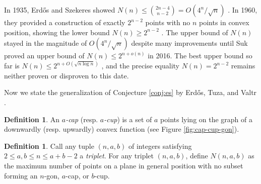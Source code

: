 \documentclass{amsart}
\theoremstyle{definition}
\newtheorem{definition}[thm]{Definition}
\numberwithin{thm}{section}
\begin{document}
In 1935, Erd\H{o}s and Szekeres showed $N(n) \leq \binom{2n-4}{n-2} = O\left(4^n/\sqrt{n}\right)$ \cite{erdos1935combinatorial}.
In 1960, they provided a construction of exactly $2^{n-2}$ points with no $n$ points in convex position, showing the lower bound $N(n) \geq 2^{n-2}$ \cite{erd1960some}.
The upper bound of $N(n)$ stayed in the magnitude of $O(4^n/\sqrt{n})$ despite many improvements 
\cite{chung1998forced,kleitman1998finding,toth1998note,toth2005erdos, mojarrad2016improved,norin2016erdHos} until Suk \cite{suk2017erdHos} proved an upper bound of $N(n) \leq 2^{n + o(n)}$ in 2016.
The best upper bound so far is $N(n) \leq 2^{n + O(\sqrt{n \log n})}$ \cite{holmsen2020two}, and the precise equality $N(n) = 2^{n - 2}$ remains neither proven or disproven to this date.

Now we state the generalization of Conjecture \ref{conj:es} by Erd\H{o}s, Tuza, and Valtr \cite{erdos1996ramsey}.

\begin{definition}
An \emph{$a$-cap} (resp. \emph{$a$-cup}) is a set of $a$ points lying on the graph of a downwardly (resp. upwardly) convex function (see Figure \ref{fig:cap-cup-gon}).
\end{definition}

\begin{definition}
Call any tuple $(n, a, b)$ of integers
satisfying $2 \leq a, b \leq n \leq a + b - 2$ a \emph{triplet}.
For any triplet $(n, a, b)$, 
define $N(n, a, b)$ as the maximum number of points on a plane in general position with no subset forming an $n$-gon, $a$-cap, or $b$-cup.
\end{definition}
\end{document}
